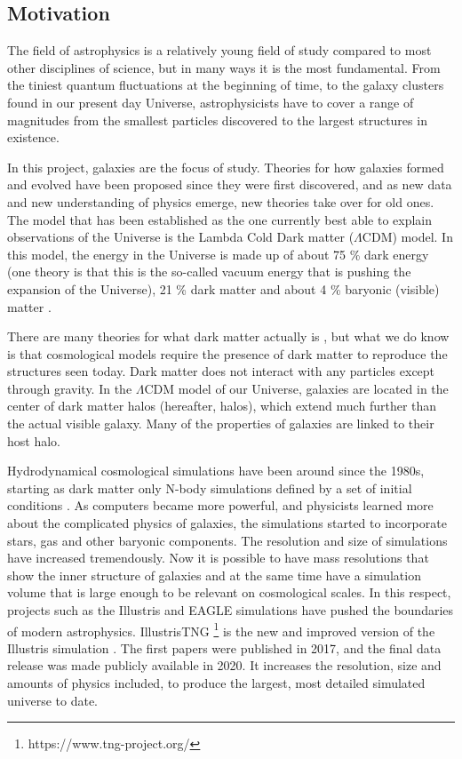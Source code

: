 
\noindent
\subsection{Motivation}
The field of astrophysics is a relatively young field of study compared to most other disciplines of science, but in many ways it is the most fundamental. From the tiniest quantum fluctuations at the beginning of time, to the galaxy clusters found in our present day Universe, astrophysicists have to cover a range of magnitudes from the smallest particles discovered to the largest structures in existence. 

In this project, galaxies are the focus of study. Theories for how galaxies formed and evolved have been proposed since they were first discovered, and as new data and new understanding of physics emerge, new theories take over for old ones. The model that has been established as the one currently best able to explain observations of the Universe is the Lambda Cold Dark matter ($\Lambda$CDM) model. In this model, the energy in the Universe is made up of about 75 \% dark energy (one theory is that this is the so-called vacuum energy that is pushing the expansion of the Universe), 21 \% dark matter and about 4 \% baryonic (visible) matter \parencite{Planck2016}. 

There are many theories for what dark matter actually is \parencite[see e.g.,][]{Boveia2018}, but what we do know is that cosmological models require the presence of dark matter to reproduce the structures seen today. Dark matter does not interact with any particles except through gravity. In the $\Lambda$CDM model of our Universe, galaxies are located in the center of dark matter halos (hereafter, halos), which extend much further than the actual visible galaxy. Many of the properties of galaxies are linked to their host halo.

Hydrodynamical cosmological simulations have been around since the 1980s, starting as dark matter only N-body simulations defined by a set of initial conditions \parencite{Frenk1983}. As computers became more powerful, and physicists learned more about the complicated physics of galaxies, the simulations started to incorporate stars, gas and other baryonic components. The resolution and size of simulations have increased tremendously. Now it is possible to have mass resolutions that show the inner structure of galaxies and at the same time have a simulation volume that is large enough to be relevant on cosmological scales. In this respect, projects such as the Illustris \parencite{Nelson2015} and EAGLE \parencite{Schaye2015} simulations have pushed the boundaries of modern astrophysics. IllustrisTNG \footnote{https://www.tng-project.org/} is the new and improved version of the Illustris simulation \parencite{Springel2018, Pillepich2017,Naiman2018, Nelson2017, Marinacci2018}. The first papers were published in 2017, and the final data release was made publicly available in 2020. It increases the resolution, size and amounts of physics included, to produce the largest, most detailed simulated universe to date. 

